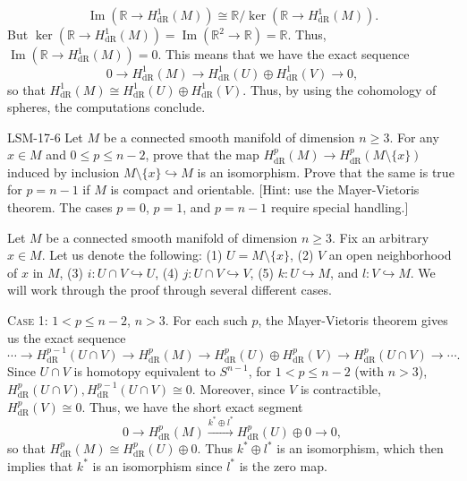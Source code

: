\documentclass{article}
\newcommand{\embedd}{\hookrightarrow}
\begin{document}
	\begin{equation*}
		\operatorname{Im}(\mathbb{R} \to H^{1}_{\text{dR}}(M)) \cong \mathbb{R}/\ker(\mathbb{R} \to H^{1}_{\text{dR}}(M)). 
	\end{equation*}
	But $\ker(\mathbb{R} \to H^{1}_{\text{dR}}(M)) = \operatorname{Im}(\mathbb{R}^{2} \to \mathbb{R}) = \mathbb{R}$. Thus, $\operatorname{Im}(\mathbb{R} \to H^{1}_{\text{dR}}(M)) = 0$. This means that we have the exact sequence 
	\begin{equation*}
		0 \to H^{1}_{\text{dR}}(M) \to H^{1}_{\text{dR}}(U) \oplus H^{1}_{\text{dR}}(V) \to 0, 
	\end{equation*}
	so that $H^{1}_{\text{dR}}(M) \cong H^{1}_{\text{dR}}(U) \oplus H^{1}_{\text{dR}}(V)$. Thus, by using the cohomology of spheres, the computations conclude. 
	
	\begin{prb}{LSM-17-6}
		Let $M$ be a connected smooth manifold of dimension $n \geq 3$. For any $x \in M$ and $0 \leq p \leq n - 2$, prove that the map $H^{p}_{\text{dR}}(M) \to H^{p}_{\text{dR}}(M \setminus \{x\})$ induced by inclusion $M \setminus \{x\} \embedd M$ is an isomorphism. Prove that the same is true for $p = n - 1$ if $M$ is compact and orientable. [Hint: use the Mayer-Vietoris theorem. The cases $p =0$, $p = 1$, and $p = n - 1$ require special handling.]
	\end{prb}
	
	Let $M$ be a connected smooth manifold of dimension $n \geq 3$. Fix an arbitrary $x \in M$. Let us denote the following: (1) $U = M \setminus \{x\}$, (2) $V$ an open neighborhood of $x$ in $M$, (3) $i: U \cap V \embedd U$, (4) $j: U \cap V \embedd V$, (5) $k: U \embedd M$, and $l: V \embedd M$. We will work through the proof through several different cases. 
	
	\textsc{Case 1:} $1 < p \leq n - 2$, $n > 3$. For each such $p$, the Mayer-Vietoris theorem gives us the exact sequence 
	\begin{equation*}
		\dotsm \to H^{p-1}_{\text{dR}}(U \cap V) \to H^{p}_{\text{dR}}(M) \to H^{p}_{\text{dR}}(U) \oplus H^{p}_{\text{dR}}(V) \to H^{p}_{\text{dR}}(U \cap V) \to \dotsm. 
	\end{equation*}
	Since $U \cap V$ is homotopy equivalent to $S^{n-1}$, for $1 < p \leq n - 2$ (with $n > 3$), $H^{p}_{\text{dR}}(U \cap V), H^{p-1}_{\text{dR}}(U \cap V) \cong 0$. Moreover, since $V$ is contractible, $H^{p}_{\text{dR}}(V) \cong 0$. Thus, we have the short exact segment 
	\begin{equation*}
		0 \to H^{p}_{\text{dR}}(M) \xrightarrow{k^{\ast} \oplus l^{\ast}} H^{p}_{\text{dR}}(U) \oplus 0 \to 0, 
	\end{equation*}
	so that $H^{p}_{\text{dR}}(M) \cong H^{p}_{\text{dR}}(U) \oplus 0$. Thus $k^{\ast} \oplus l^{\ast}$ is an isomorphism, which then implies that $k^{\ast}$ is an isomorphism since $l^{\ast}$ is the zero map. 
	
\end{document}
